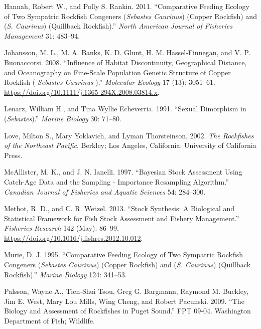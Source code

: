 \documentclass[11pt,
  english,
  a4paper,
]{article}
\begin{document}
\leavevmode\hypertarget{ref-HannahandRankin_rockfish_site_fidelity_2011}{}%
Hannah, Robert W., and Polly S. Rankin. 2011. ``Comparative Feeding Ecology of Two Sympatric Rockfish Congeners (\emph{Sebastes Caurinus}) (Copper Rockfish) and (\emph{S. Caurinus}) (Quillback Rockfish).'' \emph{North American Journal of Fisheries Management} 31: 483--94.

\leavevmode\hypertarget{ref-johansson_influence_2008}{}%
Johansson, M. L., M. A. Banks, K. D. Glunt, H. M. Hassel-Finnegan, and V. P. Buonaccorsi. 2008. ``Influence of Habitat Discontinuity, Geographical Distance, and Oceanography on Fine-Scale Population Genetic Structure of Copper Rockfish ( \emph{Sebastes Caurinus} ).'' \emph{Molecular Ecology} 17 (13): 3051--61. \url{https://doi.org/10.1111/j.1365-294X.2008.03814.x}.

\leavevmode\hypertarget{ref-LenarzandEcheverria_dimorphism_1991}{}%
Lenarz, William H., and Tina Wyllie Echeverria. 1991. ``Sexual Dimorphism in (\emph{Sebastes}).'' \emph{Marine Biology} 30: 71--80.

\leavevmode\hypertarget{ref-loveetal_2002}{}%
Love, Milton S., Mary Yoklavich, and Lyman Thorsteinson. 2002. \emph{The Rockfishes of the Northeast Pacific}. Berkley; Los Angeles, California: University of California Press.

\leavevmode\hypertarget{ref-mcallister_bayesian_1997}{}%
McAllister, M. K., and J. N. Ianelli. 1997. ``Bayesian Stock Assessment Using Catch-Age Data and the Sampling - Importance Resampling Algorithm.'' \emph{Canadian Journal of Fisheries and Aquatic Sciences} 54: 284--300.

\leavevmode\hypertarget{ref-methot_stock_2013}{}%
Methot, R. D., and C. R. Wetzel. 2013. ``Stock Synthesis: A Biological and Statistical Framework for Fish Stock Assessment and Fishery Management.'' \emph{Fisheries Research} 142 (May): 86--99. \url{https://doi.org/10.1016/j.fishres.2012.10.012}.

\leavevmode\hypertarget{ref-Murie_diet_1995}{}%
Murie, D. J. 1995. ``Comparative Feeding Ecology of Two Sympatric Rockfish Congeners (\emph{Sebastes Caurinus}) (Copper Rockfish) and (\emph{S. Caurinus}) (Quillback Rockfish).'' \emph{Marine Biology} 124: 341--53.

\leavevmode\hypertarget{ref-Palssonetal_2009}{}%
Palsson, Wayne A., Tien-Shui Tsou, Greg G. Bargmann, Raymond M. Buckley, Jim E. West, Mary Lou Mills, Wing Cheng, and Robert Pacunski. 2009. ``The Biology and Assessment of Rockfishes in Puget Sound.'' FPT 09-04. Washington Department of Fish; Wildlife.
\end{document}
